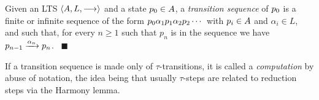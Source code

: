


 \begin{definition} %
   \label{def:inf-transition-sequence}
   Given an LTS  $\langle  A ,  L ,  \mathrel{\overset{}\longrightarrow}  \rangle$ and a state $p_0 \in
  A$, a \emph{transition sequence} of $p_0$ is a finite or infinite
  sequence of the form $p_0 \alpha_1 p_1 \alpha_2
  p_2 \cdots$ with $p_i \in A$ and $\alpha_i \in L$, and
  such that, for every $n \geq 1$ such that $p_n$ is in the sequence we have
  $p_{n-1} \xrightarrow{\alpha_n} p_{n}$.
~\hfill$\blacksquare$
 \end{definition}
 \noindent
 If a transition sequence %
 is made only of  $\tau$-transitions, 
 it is called a {\em computation} by abuse of notation, the idea being that
 usually $\tau$-steps are related to reduction steps via the Harmony
 lemma.

